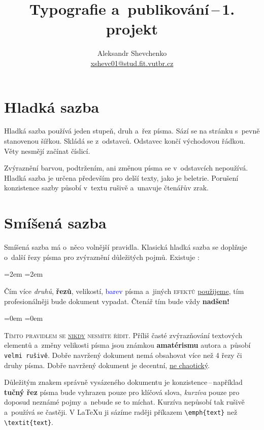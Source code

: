 \documentclass[10pt, a4paper, twocolumn]{article}
\title{Typografie a~publikování\,--\,1. projekt}
\author{Aleksandr Shevchenko \\     \href{mailto:xshevc01@stud.fit.vutbr.cz}{xshevc01@stud.fit.vutbr.cz} }
\date{}
\begin{document}
\maketitle

\section{Hladká sazba}

Hladká sazba používá jeden stupeň, druh a~řez písma.
Sází se na stránku s~pevně stanovenou šířkou.
Skládá se z~odstavců. Odstavec končí východovou řádkou.
Věty nesmějí začínat číslicí.

Zvýraznění barvou, podtržením, ani změnou písma se v~odstavcích nepoužívá.
Hladká sazba je určena především pro delší texty, jako je beletrie.
Porušení konzistence sazby působí v~textu rušivě a~unavuje čtenářův zrak.


\section{Smíšená sazba}
\label{section:2}
Smíšená sazba má o~něco volnější pravidla.
Klasická hladká sazba se doplňuje o~další řezy písma pro zvýraznění důležitých pojmů.
Existuje :

\begin{spacing}{1.5}
\end{spacing}

\leftskip=2em \rightskip=2em

\hspace{0.5em}Čím více \emph{druhů}, {\bf řezů}, {\huge velikostí}, \textcolor{blue}{barev} písma a~jiných \textsc{\color{red} efektů} \underline{použijeme}, tím {\color {orange}profesionálněji} bude {\Large {}\selectfont dokument} vypadat.
{\tiny Čtenář} tím bude vždy {\Huge \bf nadšen!}

\begin{spacing}{1.4}
\end{spacing}

\leftskip=0em \rightskip=0em

\textsc{Tímto pravidlem se \underline{nikdy} nesmíte řídit}.
Příliš časté zvýrazňování textových elementů a~změny {\tiny velikosti} písma jsou známkou {\bf amatérismu} autora a~působí \texttt{velmi rušivě}.
Dobře navržený dokument nemá obsahovat více než 4 řezy či druhy písma.
Dobře navržený dokument je decentní, \underline{ne chaotický}.

Důležitým znakem správně vysázeného dokumentu je konzistence\,--\,například {\bf tučný řez} písma bude vyhrazen pouze pro klíčová slova, \emph{kurzíva} pouze pro doposud neznámé pojmy a~nebude se to míchat.
Kurzíva nepůsobí tak rušivě a~používá se častěji.
V \LaTeX u ji sázíme raději příkazem \texttt{\textbackslash emph\{text\}} než \texttt{\textbackslash textit\{text\}}.
\end{document}
